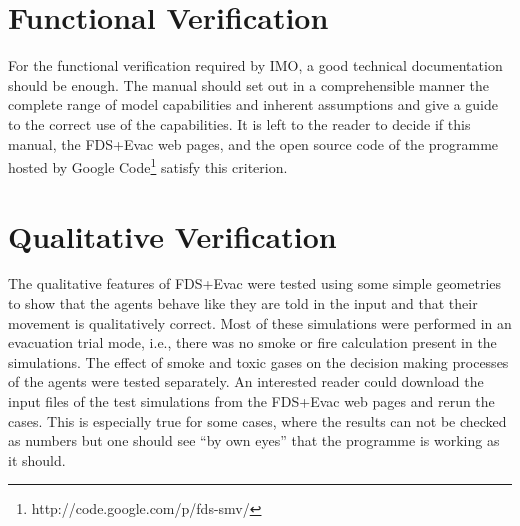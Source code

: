 \documentclass[12pt,a4paper,final,twoside]{stylevk}
\begin{document}
\section{Functional Verification}\label{Sec_FuncVeri}

\noindent For the functional verification required by IMO, a good
technical documentation should be enough.  The manual should set out
in a comprehensible manner the complete range of model capabilities
and inherent assumptions and give a guide to the correct use of the
capabilities.  It is left to the reader to decide if this manual, the
FDS+Evac web pages, and the open source code of the programme hosted
by Google Code\footnote{http://code.google.com/p/fds-smv/} satisfy
this criterion.


\section{Qualitative Verification}\label{Sec_QualVeri}

\noindent The qualitative features of FDS+Evac were tested using some
simple geometries to show that the agents behave like they are told in
the input and that their movement is qualitatively correct.  Most of
these simulations were performed in an evacuation trial mode,
i.e., there was no smoke or fire calculation present in the
simulations.  The effect of smoke and toxic gases on the decision
making processes of the agents were tested separately.  An interested
reader could download the input files of the test simulations from the
FDS+Evac web pages and rerun the cases.  This is especially true for
some cases, where the results can not be checked as numbers but one
should see ``by own eyes'' that the programme is working as it should.
\end{document}
